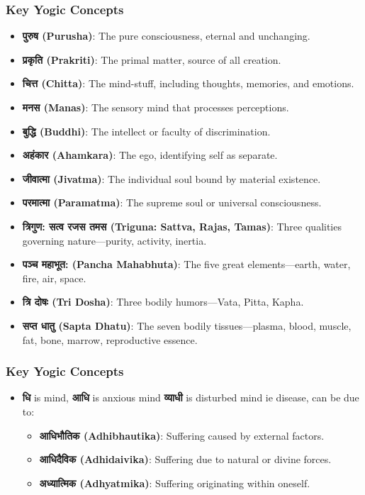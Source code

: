\begin{frame}[fragile]\frametitle{Key Yogic Concepts}
      \begin{itemize}
        \item \textbf{पुरुष (Purusha)}: The pure consciousness, eternal and unchanging.
        \item \textbf{प्रकृति (Prakriti)}: The primal matter, source of all creation.
        \item \textbf{चित्त (Chitta)}: The mind-stuff, including thoughts, memories, and emotions.
        \item \textbf{मनस (Manas)}: The sensory mind that processes perceptions.
        \item \textbf{बुद्धि (Buddhi)}: The intellect or faculty of discrimination.
        \item \textbf{अहंकार (Ahamkara)}: The ego, identifying self as separate.
        \item \textbf{जीवात्मा (Jivatma)}: The individual soul bound by material existence.
        \item \textbf{परमात्मा (Paramatma)}: The supreme soul or universal consciousness.
        \item \textbf{त्रिगुण: सत्व रजस तमस (Triguna: Sattva, Rajas, Tamas)}: Three qualities governing nature—purity, activity, inertia.
        \item \textbf{पञ्च महाभूत: (Pancha Mahabhuta)}: The five great elements—earth, water, fire, air, space.
        \item \textbf{त्रि दोषः (Tri Dosha)}: Three bodily humors—Vata, Pitta, Kapha.
        \item \textbf{सप्त धातु (Sapta Dhatu)}: The seven bodily tissues—plasma, blood, muscle, fat, bone, marrow, reproductive essence.
      \end{itemize}
\end{frame}

\begin{frame}[fragile]\frametitle{Key Yogic Concepts}
      \begin{itemize}
		\item \textbf{धि} is mind, \textbf{आधि} is anxious mind \textbf{व्याधी } is disturbed mind ie disease, can be due to:
		\begin{itemize}
			\item \textbf{आधिभौतिक (Adhibhautika)}: Suffering caused by external factors.
			\item \textbf{आधिदैविक (Adhidaivika)}: Suffering due to natural or divine forces.
			\item \textbf{अध्यात्मिक (Adhyatmika)}: Suffering originating within oneself.
		\end{itemize}

      \end{itemize}
\end{frame}



